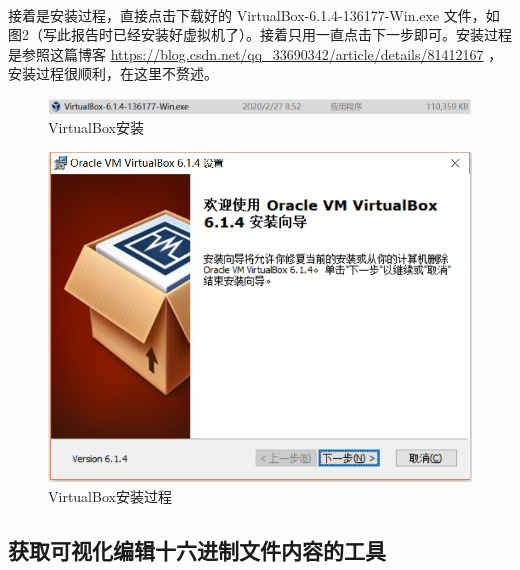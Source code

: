 \documentclass[12pt]{article}
\begin{document}
			\paragraph{}接着是安装过程，直接点击下载好的 VirtualBox-6.1.4-136177-Win.exe 文件，如图2（写此报告时已经安装好虚拟机了）。接着只用一直点击下一步即可。安装过程是参照这篇博客 \url{https://blog.csdn.net/qq_33690342/article/details/81412167} ，安装过程很顺利，在这里不赘述。
		\begin{figure}[H]
			\centering
			\includegraphics[width=14cm]{./figures/VirtualBoxEXE.png}
			\caption{VirtualBox安装} 
		\end{figure}
		\begin{figure}[H]
			\centering
			\includegraphics[width=12cm]{./figures/VirtualBoxInstall.png}
			\caption{VirtualBox安装过程} 
		\end{figure}


	\subsection{\Large 获取可视化编辑十六进制文件内容的工具}
\end{document}
